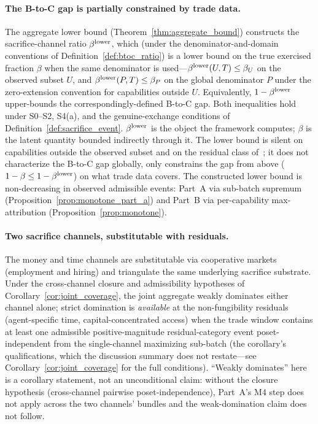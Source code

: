\paragraph{The B-to-C gap is partially constrained by trade data.}
The aggregate lower bound
(Theorem~\ref{thm:aggregate_bound}) constructs the
sacrifice-channel ratio $\beta^{\mathrm{lower}}$, which (under the
denominator-and-domain conventions of
Definition~\ref{def:btoc_ratio}) is a lower bound on the
true exercised fraction $\beta$ when the same denominator is
used---$\beta^{\mathrm{lower}}(U,T) \leq \beta_U$ on the observed subset $U$,
and $\beta^{\mathrm{lower}}(P,T) \leq \beta_P$ on the global denominator $P$
under the zero-extension convention for capabilities outside
$U$.  Equivalently, $1 - \beta^{\mathrm{lower}}$ upper-bounds the
correspondingly-defined B-to-C gap.  Both inequalities hold
under S0--S2, S4(a), and the genuine-exchange conditions of
Definition~\ref{def:sacrifice_event}.  $\beta^{\mathrm{lower}}$ is the object
the framework computes; $\beta$ is the latent quantity bounded
indirectly through it.  The
lower bound is silent on capabilities outside the observed
subset and on the residual class
of~\citep[Need~Sufficiency]{lasser2026paper8b}; it does not characterize the
B-to-C gap globally, only constrains the gap from above
($1 - \beta \leq 1 - \beta^{\mathrm{lower}}$) on what trade data covers.
The constructed lower bound is non-decreasing in observed
admissible events: Part~A via sub-batch supremum
(Proposition~\ref{prop:monotone_part_a}) and Part~B via
per-capability max-attribution
(Proposition~\ref{prop:monotone}).

\paragraph{Two sacrifice channels, substitutable with residuals.}
The money and time channels are substitutable via cooperative
markets (employment and hiring) and triangulate the same
underlying sacrifice substrate.  Under the cross-channel
closure and admissibility hypotheses of
Corollary~\ref{cor:joint_coverage}, the joint aggregate weakly
dominates either channel alone; strict domination is
\emph{available} at the non-fungibility residuals
(agent-specific time, capital-concentrated access) when the
trade window contains at least one admissible
positive-magnitude residual-category event poset-independent
from the single-channel maximizing sub-batch (the corollary's
qualifications, which the discussion summary does not
restate---see Corollary~\ref{cor:joint_coverage} for the full
conditions).  ``Weakly dominates''
here is a corollary statement, not an unconditional claim:
without the closure hypothesis (cross-channel pairwise
poset-independence), Part~A's M4 step does not apply across
the two channels' bundles and the weak-domination claim does
not follow.

